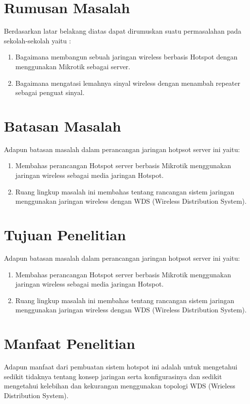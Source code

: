 \documentclass{jtetiproposalskripsi}
\begin{document}
\section{Rumusan Masalah}
Berdasarkan latar belakang diatas dapat dirumuskan suatu permasalahan pada sekolah-sekolah yaitu :
\begin{enumerate}
\item Bagaimana membangun sebuah jaringan wireless berbasis Hotspot dengan menggunakan Mikrotik sebagai server.
\item Bagaimana mengatasi lemahnya sinyal wireless dengan menambah repeater sebagai penguat sinyal.
\end{enumerate}

\section{Batasan Masalah}
Adapun batasan masalah dalam perancangan jaringan hotpsot server ini yaitu:
\begin{enumerate}
\item Membahas perancangan Hotspot server berbasis Mikrotik menggunakan jaringan wireless sebagai media jaringan Hotspot.
\item Ruang lingkup masalah ini membahas tentang rancangan sistem jaringan menggunakan jaringan wireless dengan WDS (Wireless Distribution System).
\end{enumerate}

\section{Tujuan Penelitian}
Adapun batasan masalah dalam perancangan jaringan hotpsot server ini yaitu:
\begin{enumerate}
\item Membahas perancangan Hotspot server berbasis Mikrotik menggunakan jaringan wireless sebagai media jaringan Hotspot.
\item Ruang lingkup masalah ini membahas tentang rancangan sistem jaringan menggunakan jaringan wireless dengan WDS (Wireless Distribution System).
\end{enumerate}

\section{Manfaat Penelitian}
Adapun manfaat dari pembuatan sistem hotspot ini adalah untuk mengetahui sedikit tidaknya tentang konsep jaringan serta konfigurasinya dan sedikit mengetahui kelebihan dan kekurangan menggunakan topologi WDS (Wrieless Distribution System).
\end{document}

